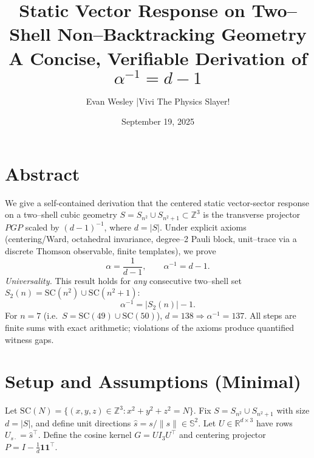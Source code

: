 \title{\Large Static Vector Response on Two–Shell Non–Backtracking Geometry\\[2pt]
\large A Concise, Verifiable Derivation of $\alpha^{-1}=d-1$}
\author{\normalsize Evan Wesley \quad|\quad Vivi The Physics Slayer!}
\date{\normalsize September 19, 2025}
\maketitle

\makeatletter
{}
\makeatother

\section*{Abstract}
We give a self-contained derivation that the centered static vector-sector response on a two–shell cubic geometry
\(
S=S_{n^2}\cup S_{n^2+1}\subset\mathbb{Z}^3
\)
is the transverse projector \(PGP\) scaled by \((d-1)^{-1}\), where \(d=|S|\).
Under explicit axioms (centering/Ward, octahedral invariance, degree–2 Pauli block, unit–trace via a discrete Thomson observable, finite templates), we prove
\[
\alpha=\frac{1}{d-1},\qquad \alpha^{-1}=d-1.
\]
\emph{Universality.} This result holds for \emph{any} consecutive two–shell set \(S_2(n)=\mathrm{SC}(n^2)\cup\mathrm{SC}(n^2\!+\!1)\):
\[
\alpha^{-1}=|S_2(n)|-1.
\]
For \(n=7\) (i.e.\ \(S=\mathrm{SC}(49)\cup\mathrm{SC}(50)\)), \(d=138\Rightarrow \alpha^{-1}=137\).
All steps are finite sums with exact arithmetic; violations of the axioms produce quantified witness gaps.

\section{Setup and Assumptions (Minimal)}
Let \(\mathrm{SC}(N)=\{(x,y,z)\in\mathbb{Z}^3:x^2+y^2+z^2=N\}\).
Fix \(S=S_{n^2}\cup S_{n^2+1}\) with size \(d=|S|\), and define unit directions \(\hat s=s/\|s\|\in\mathbb{S}^2\).
Let \(U\in\mathbb{R}^{d\times 3}\) have rows \(U_{s\cdot}=\hat s^\top\).
Define the cosine kernel \(G=U I_3 U^\top\) and centering projector \(P=I-\frac{1}{d}\mathbf{1}\mathbf{1}^\top\).

